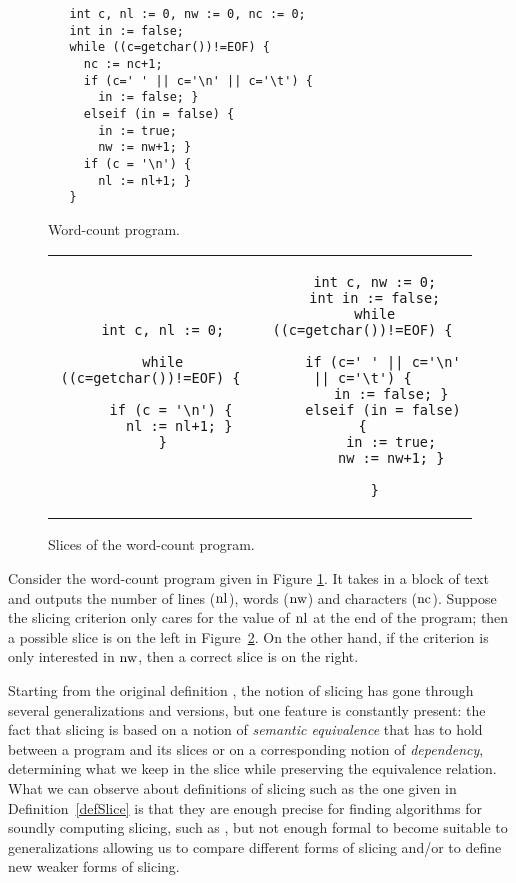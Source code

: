 \documentclass[prodmode,acmtocl]{acmsmall}
\newcommand{\0}{\mbox{\bf 0}}
\newcommand{\CODE}[1]{\ensuremath{\mbox{\lstinline!#1!}\xspace}\xspace}
\begin{document}
\begin{figure}
  \begin{lstlisting}
   int c, nl := 0, nw := 0, nc := 0;
   int in := false;
   while ((c=getchar())!=EOF) {
     nc := nc+1;
     if (c=' ' || c='\n' || c='\t') {
       in := false; }
     elseif (in = false) { 
       in := true;
       nw := nw+1; }
     if (c = '\n') {
       nl := nl+1; }
   }
  \end{lstlisting}
  \caption{Word-count program.}\label{programs}
\end{figure}
  
\begin{figure}
  \hspace{-3mm}  \begin{tabular}{c|c}
    \begin{lstlisting}
   int c, nl := 0;
   
   while ((c=getchar())!=EOF) {
     
     if (c = '\n') {
       nl := nl+1; }
   }
      \end{lstlisting}
      &
      \begin{lstlisting}
   int c, nw := 0;
   int in := false;
   while ((c=getchar())!=EOF) {
     
     if (c=' ' || c='\n' || c='\t') {
       in := false; }
     elseif (in = false) {
       in := true;
       nw := nw+1; }
     
   }
      \end{lstlisting}
  \end{tabular}
  \caption{Slices of the word-count program.}\label{example}
\end{figure}

\begin{example}
  Consider the word-count program \cite{MDT07} given in
  Figure \ref{programs}.  It takes in a block of text and outputs the
  number of lines (\CODE{nl}), words (\CODE{nw}) and characters
  (\CODE{nc}).  Suppose the slicing criterion only cares for the value
  of \CODE{nl} at the end of the program; then a possible slice is on
  the left in Figure~\ref{example}.  On the other hand, if the
  criterion is only interested in \CODE{nw}, then a correct slice is
  on the right.
\end{example}

Starting from the original definition \cite{weiser}, the notion of
slicing has gone through several generalizations and versions, but one
feature is constantly present: the fact that slicing is based on a
notion of \emph{semantic equivalence} that has to hold between a
program and its slices or on a corresponding notion of
\emph{dependency}, determining what we keep in the slice while
preserving the equivalence relation.  What we can observe about
definitions of slicing such as the one given in
Definition~\ref{defSlice} is that they are enough precise for finding
algorithms for soundly computing slicing, such as \cite{RY88}, but not
enough formal to become suitable to generalizations allowing us to
compare different forms of slicing and/or to define new weaker forms
of slicing.
  
\end{document}
